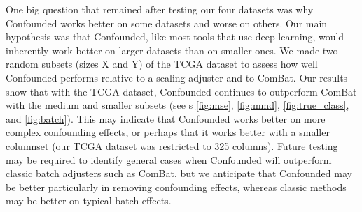 \documentclass{article}
\begin{document}
One big question that remained after testing our four datasets was why Confounded works better on some datasets and worse on others.
Our main hypothesis was that Confounded, like most tools that use deep learning, would inherently work better on larger datasets than on smaller ones.
We made two random subsets (sizes X and Y) of the TCGA dataset to assess how well Confounded performs relative to a scaling adjuster and to ComBat. %
Our results show that with the TCGA dataset, Confounded continues to outperform ComBat with the medium and smaller subsets (see \figurename{s} \ref{fig:mse}, \ref{fig:mmd}, \ref{fig:true_class}, and \ref{fig:batch}).
This may indicate that Confounded works better on more complex confounding effects, or perhaps that it works better with a smaller columnset (our TCGA dataset was restricted to 325 columns).
Future testing may be required to identify general cases when Confounded will outperform classic batch adjusters such as ComBat, but we anticipate that Confounded may be better particularly in removing confounding effects, whereas classic methods may be better on typical batch effects.

\newcommand{\disclaimer}{\textit{Note: the scaling function produced errors when run on the small TCGA dataset and was therefore not used in this chart.}}
\end{document}
